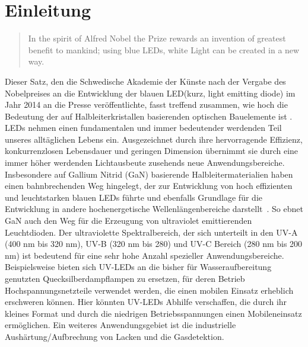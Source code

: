 
\chapter{Einleitung}
\thispagestyle{fancy}

\begin{quote}
In the spirit of Alfred Nobel the Prize rewards an invention of greatest benefit to mankind; using blue LEDs, white Light can be created in a new way.\end{quote}
\raggedright
Dieser Satz, den die Schwedische Akademie der Künste nach der Vergabe des Nobelpreises an die Entwicklung der blauen LED(kurz, light emitting diode) im Jahr 2014 an die Presse veröffentlichte, fasst treffend zusammen, wie hoch die Bedeutung der auf Halbleiterkristallen basierenden optischen Bauelemente ist . LEDs nehmen einen fundamentalen und immer bedeutender werdenden Teil unseres alltäglichen Lebens ein. Ausgezeichnet durch ihre hervorragende Effizienz, konkurrenzlosen Lebensdauer und geringen Dimension übernimmt sie durch eine immer höher werdenden Lichtausbeute zusehends neue Anwendungsbereiche. Insbesondere auf Gallium Nitrid (GaN) basierende Halbleitermaterialien haben einen bahnbrechenden Weg hingelegt, der zur Entwicklung von hoch effizienten und leuchtstarken blauen LEDs führte und ebenfalls Grundlage für die Entwicklung in andere hochenergetische Wellenlängenbereiche darstellt~\cite{risk}. So ebnet GaN auch den Weg für die Erzeugung von ultraviolet emittierenden Leuchtdioden. Der ultraviolette Spektralbereich, der sich unterteilt in den UV-A (400 nm bis 320 nm), UV-B (320 nm bis 280) und UV-C Bereich (280 nm bis 200 nm) ist bedeutend für eine sehr hohe Anzahl spezieller Anwendungsbereiche. Beispielsweise bieten sich UV-LEDs an die bisher für Wasseraufbereitung genutzten Quecksilberdampflampen zu ersetzen, für deren Betrieb Hochspannungsnetzteile verwendet werden, die einen mobilen Einsatz erheblich erschweren können. Hier könnten UV-LEDs Abhilfe verschaffen, die durch ihr kleines Format und durch die niedrigen Betriebsspannungen einen Mobileneinsatz ermöglichen. Ein weiteres Anwendungsgebiet ist die industrielle Aushärtung/Aufbrechung von Lacken und die Gasdetektion. 
